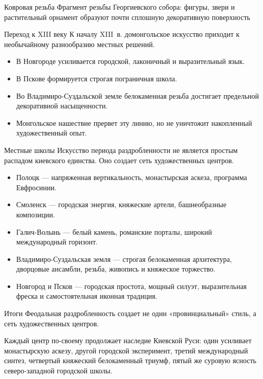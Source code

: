 \begin{frame}{Ковровая резьба}
    {Фрагмент резьбы Георгиевского собора:
     фигуры, звери и растительный орнамент образуют почти сплошную
     декоративную поверхность}
\end{frame}

\begin{frame}{Переход к XIII веку}
  К началу XIII~в. домонгольское искусство приходит
  к необычайному разнообразию местных решений.

  \begin{itemize}
    \item В Новгороде усиливается городской, лаконичный
          и выразительный язык.
    \item В Пскове формируется строгая пограничная школа.
    \item Во Владимиро-Суздальской земле белокаменная резьба
          достигает предельной декоративной насыщенности.
    \item Монгольское нашествие прервет эту линию,
          но не уничтожит накопленный художественный опыт.
  \end{itemize}
\end{frame}

\begin{frame}{Местные школы}
  Искусство периода раздробленности не является простым распадом
  киевского единства. Оно создает сеть художественных центров.

  \begin{itemize}
    \item Полоцк --- напряженная вертикальность, монастырская аскеза,
          программа Евфросинии.
    \item Смоленск --- городская энергия, княжеские артели,
          башнеобразные композиции.
    \item Галич-Волынь --- белый камень, романские порталы,
          широкий международный горизонт.
    \item Владимиро-Суздальская земля --- строгая белокаменная
          архитектура, дворцовые ансамбли, резьба, живопись
          и княжеское торжество.
    \item Новгород и Псков --- городская простота, мощный силуэт,
          выразительная фреска и самостоятельная иконная традиция.
  \end{itemize}
\end{frame}

\begin{frame}{Итоги}
  Феодальная раздробленность создает не один «провинциальный»
  стиль, а сеть художественных центров.

  \vspace{1em}
  Каждый центр по-своему продолжает наследие Киевской Руси:
  один усиливает монастырскую аскезу, другой городской эксперимент,
  третий международный синтез, четвертый княжеский белокаменный
  триумф, пятый же суровую ясность северо-западной городской школы.
\end{frame}
